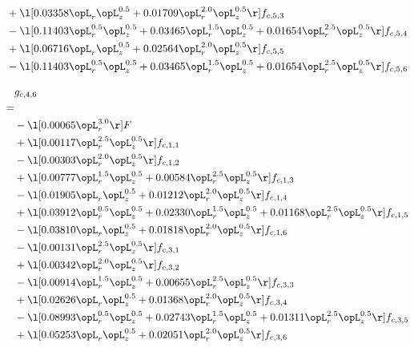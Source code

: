 \begin{alignat}{2}
& + \l[  0.03358 \opL_r \opL_z^{0.5} +  0.01709 \opL_r^{2.0} \opL_z^{0.5}  \r] f_{c,5,3} \nonumber \\ 
& - \l[  0.11403 \opL_r^{0.5} \opL_z^{0.5} +  0.03465 \opL_r^{1.5} \opL_z^{0.5} +  0.01654 \opL_r^{2.5} \opL_z^{0.5}  \r] f_{c,5,4} \nonumber \\ 
& + \l[  0.06716 \opL_r \opL_z^{0.5} +  0.02564 \opL_r^{2.0} \opL_z^{0.5}  \r] f_{c,5,5} \nonumber \\ 
& - \l[  0.11403 \opL_r^{0.5} \opL_z^{0.5} +  0.03465 \opL_r^{1.5} \opL_z^{0.5} +  0.01654 \opL_r^{2.5} \opL_z^{0.5}  \r] f_{c,5,6} \nonumber \\ 
\end{alignat} 


\begin{alignat}{2} 
\label{eq:g_46_0} 
& g_{c,4,6} \nonumber \\ 
 = \\ 
& - \l[  0.00065 \opL_r^{3.0}  \r] F \nonumber \\ 
& + \l[  0.00117 \opL_r^{2.5} \opL_z^{0.5}  \r] f_{c,1,1} \nonumber \\ 
& - \l[  0.00303 \opL_r^{2.0} \opL_z^{0.5}  \r] f_{c,1,2} \nonumber \\ 
& + \l[  0.00777 \opL_r^{1.5} \opL_z^{0.5} +  0.00584 \opL_r^{2.5} \opL_z^{0.5}  \r] f_{c,1,3} \nonumber \\ 
& - \l[  0.01905 \opL_r \opL_z^{0.5} +  0.01212 \opL_r^{2.0} \opL_z^{0.5}  \r] f_{c,1,4} \nonumber \\ 
& + \l[  0.03912 \opL_r^{0.5} \opL_z^{0.5} +  0.02330 \opL_r^{1.5} \opL_z^{0.5} +  0.01168 \opL_r^{2.5} \opL_z^{0.5}  \r] f_{c,1,5} \nonumber \\ 
& - \l[  0.03810 \opL_r \opL_z^{0.5} +  0.01818 \opL_r^{2.0} \opL_z^{0.5}  \r] f_{c,1,6} \nonumber \\ 
& - \l[  0.00131 \opL_r^{2.5} \opL_z^{0.5}  \r] f_{c,3,1} \nonumber \\ 
& + \l[  0.00342 \opL_r^{2.0} \opL_z^{0.5}  \r] f_{c,3,2} \nonumber \\ 
& - \l[  0.00914 \opL_r^{1.5} \opL_z^{0.5} +  0.00655 \opL_r^{2.5} \opL_z^{0.5}  \r] f_{c,3,3} \nonumber \\ 
& + \l[  0.02626 \opL_r \opL_z^{0.5} +  0.01368 \opL_r^{2.0} \opL_z^{0.5}  \r] f_{c,3,4} \nonumber \\ 
& - \l[  0.08993 \opL_r^{0.5} \opL_z^{0.5} +  0.02743 \opL_r^{1.5} \opL_z^{0.5} +  0.01311 \opL_r^{2.5} \opL_z^{0.5}  \r] f_{c,3,5} \nonumber \\ 
& + \l[  0.05253 \opL_r \opL_z^{0.5} +  0.02051 \opL_r^{2.0} \opL_z^{0.5}  \r] f_{c,3,6} \nonumber \\ 

\end{alignat}
